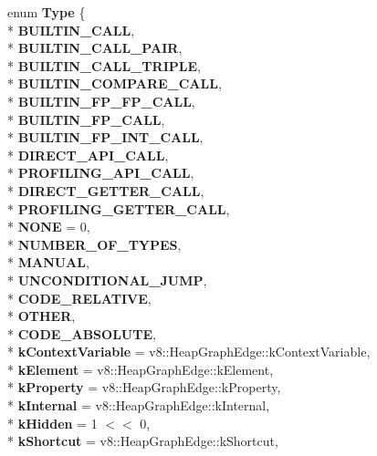 \begin{DoxyCompactItemize}
\item 
enum {\bfseries Type} \{ \\*
{\bfseries B\+U\+I\+L\+T\+I\+N\+\_\+\+C\+A\+LL}, 
\\*
{\bfseries B\+U\+I\+L\+T\+I\+N\+\_\+\+C\+A\+L\+L\+\_\+\+P\+A\+IR}, 
\\*
{\bfseries B\+U\+I\+L\+T\+I\+N\+\_\+\+C\+A\+L\+L\+\_\+\+T\+R\+I\+P\+LE}, 
\\*
{\bfseries B\+U\+I\+L\+T\+I\+N\+\_\+\+C\+O\+M\+P\+A\+R\+E\+\_\+\+C\+A\+LL}, 
\\*
{\bfseries B\+U\+I\+L\+T\+I\+N\+\_\+\+F\+P\+\_\+\+F\+P\+\_\+\+C\+A\+LL}, 
\\*
{\bfseries B\+U\+I\+L\+T\+I\+N\+\_\+\+F\+P\+\_\+\+C\+A\+LL}, 
\\*
{\bfseries B\+U\+I\+L\+T\+I\+N\+\_\+\+F\+P\+\_\+\+I\+N\+T\+\_\+\+C\+A\+LL}, 
\\*
{\bfseries D\+I\+R\+E\+C\+T\+\_\+\+A\+P\+I\+\_\+\+C\+A\+LL}, 
\\*
{\bfseries P\+R\+O\+F\+I\+L\+I\+N\+G\+\_\+\+A\+P\+I\+\_\+\+C\+A\+LL}, 
\\*
{\bfseries D\+I\+R\+E\+C\+T\+\_\+\+G\+E\+T\+T\+E\+R\+\_\+\+C\+A\+LL}, 
\\*
{\bfseries P\+R\+O\+F\+I\+L\+I\+N\+G\+\_\+\+G\+E\+T\+T\+E\+R\+\_\+\+C\+A\+LL}, 
\\*
{\bfseries N\+O\+NE} = 0, 
\\*
{\bfseries N\+U\+M\+B\+E\+R\+\_\+\+O\+F\+\_\+\+T\+Y\+P\+ES}, 
\\*
{\bfseries M\+A\+N\+U\+AL}, 
\\*
{\bfseries U\+N\+C\+O\+N\+D\+I\+T\+I\+O\+N\+A\+L\+\_\+\+J\+U\+MP}, 
\\*
{\bfseries C\+O\+D\+E\+\_\+\+R\+E\+L\+A\+T\+I\+VE}, 
\\*
{\bfseries O\+T\+H\+ER}, 
\\*
{\bfseries C\+O\+D\+E\+\_\+\+A\+B\+S\+O\+L\+U\+TE}, 
\\*
{\bfseries k\+Context\+Variable} = v8\+:\+:Heap\+Graph\+Edge\+:\+:k\+Context\+Variable, 
\\*
{\bfseries k\+Element} = v8\+:\+:Heap\+Graph\+Edge\+:\+:k\+Element, 
\\*
{\bfseries k\+Property} = v8\+:\+:Heap\+Graph\+Edge\+:\+:k\+Property, 
\\*
{\bfseries k\+Internal} = v8\+:\+:Heap\+Graph\+Edge\+:\+:k\+Internal, 
\\*
{\bfseries k\+Hidden} = 1 $<$$<$ 0, 
\\*
{\bfseries k\+Shortcut} = v8\+:\+:Heap\+Graph\+Edge\+:\+:k\+Shortcut, 
$$
\end{DoxyCompactItemize}
